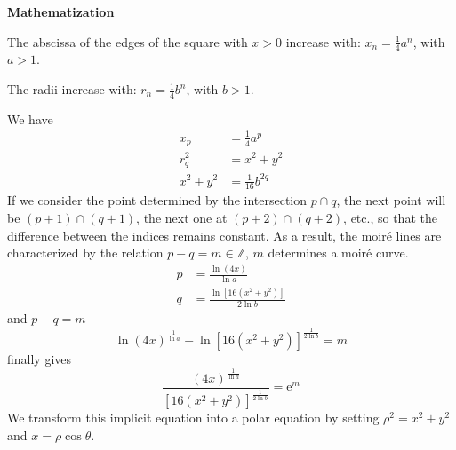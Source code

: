 \documentclass[%
    11pt,
    english,
    BCOR10mm,
    DIV12,
    bibliography=totoc,
    parskip=false,
    fleqn,
    smallheadings,
    headexclude,
    footexclude,
    oneside,
    dvipsnames,
    svgnames,
    x11names
]{pst-doc}
\begin{document}
{{{\begin{center}
\hfill
{}
\end{center}

\textbf{Mathematization}

The abscissa of the edges of the square with $x>0$ increase with: $x_n=\frac{1}{4}a^n$, with $a>1$.

The radii increase with: $r_n=\frac{1}{4}b^n$, with $b>1$.

We have
\begin{align*}
x_p&=\frac{1}{4}a^p\\
r_q^2&=x^2+y^2\\
x^2+y^2&=\frac{1}{16}b^{2q}
\end{align*}
If we consider the point determined by the intersection $p\cap q$, the next point will be $(p+1)\cap (q+1)$, the next one at $(p+2)\cap (q+2)$, etc., so that the difference between the indices remains constant. As a result, the moiré lines are characterized by the relation $p-q=m \in \mathbb{Z}$, $m$ determines a moiré curve.
\begin{align*}
p&=\frac{\ln(4x)}{\ln a}\\
q&=\frac{\ln[16(x^2+y^2)]}{2\ln b}
\end{align*}
and $p-q=m$
\begin{equation*}
\ln(4x)^{\frac{1}{\ln a}}-\ln[16(x^2+y^2)]^{\frac{1}{2\ln b}}=m
\end{equation*}
finally gives
\begin{equation*}
\frac{(4x)^{\frac{1}{\ln a}}}{[16(x^2+y^2)]^{\frac{1}{2\ln b}}}=\text{e}^m
\end{equation*}
We transform this implicit equation into a polar equation by setting $\rho^2=x^2+y^2$ and $x=\rho\cos\theta$.

}}}
\end{document}
